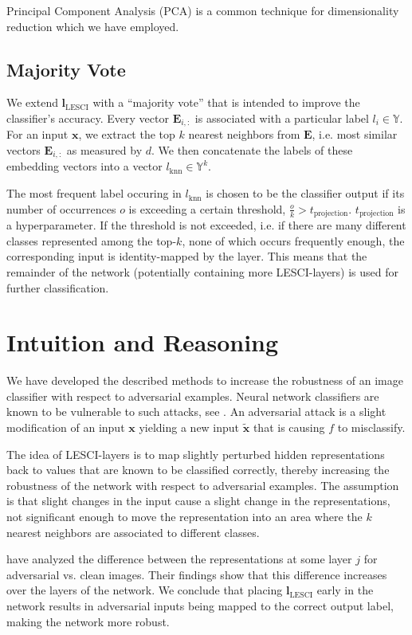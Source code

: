 \documentclass{article}
\begin{document}
Principal Component Analysis (PCA) is a common technique for dimensionality reduction which we have employed.

\subsection{Majority Vote}
We extend $\bm{l}_\text{LESCI}$ with a \enquote{majority vote} that is intended to improve the classifier's accuracy.
Every vector $\bm{E}_{i,:}$ is associated with a particular label $l_i\in\mathbb{Y}$. For an input $\bm{x}$, we extract the top $k$ nearest neighbors from $\bm{E}$, i.e. most similar vectors $\bm{E}_{i,:}$ as measured by $d$.
We then concatenate the labels of these embedding vectors into a vector $l_\text{knn} \in \mathbb{Y}^k$. 

The most frequent label occuring in $l_\text{knn}$ is chosen to be the classifier output if its number of occurrences $o$ is exceeding a certain threshold, $\frac{o}{k}>t_\text{projection}$.
$t_\text{projection}$ is a hyperparameter.
If the threshold is not exceeded, i.e. if there are many different classes represented among the top-$k$, none of which occurs frequently enough, the corresponding input is identity-mapped by the layer.
This means that the remainder of the network (potentially containing more LESCI-layers) is used for further classification.

\section{Intuition and Reasoning}

We have developed the described methods to increase the robustness of an image classifier with respect to adversarial examples.
Neural network classifiers are known to be vulnerable to such attacks, see \cite{goodfellow-adversarial}.
An adversarial attack is a slight modification of an input $\bm{x}$ yielding a new input $\tilde{\bm{x}}$ that is causing $f$ to misclassify.

The idea of LESCI-layers is to map slightly perturbed hidden representations back to values that are known to be classified correctly, thereby increasing the robustness of the network with respect to adversarial examples.
The assumption is that slight changes in the input cause a slight change in the representations, not significant enough to move the representation into an area where the $k$ nearest neighbors are associated to different classes.

\cite{layerwise-perturbations} have analyzed the difference between the representations at some layer $j$ for adversarial vs. clean images.
Their findings show that this difference increases over the layers of the network.
We conclude that placing $\bm{l}_\text{LESCI}$ early in the network results in adversarial inputs being mapped to the correct output label, making the network more robust.
\end{document}
